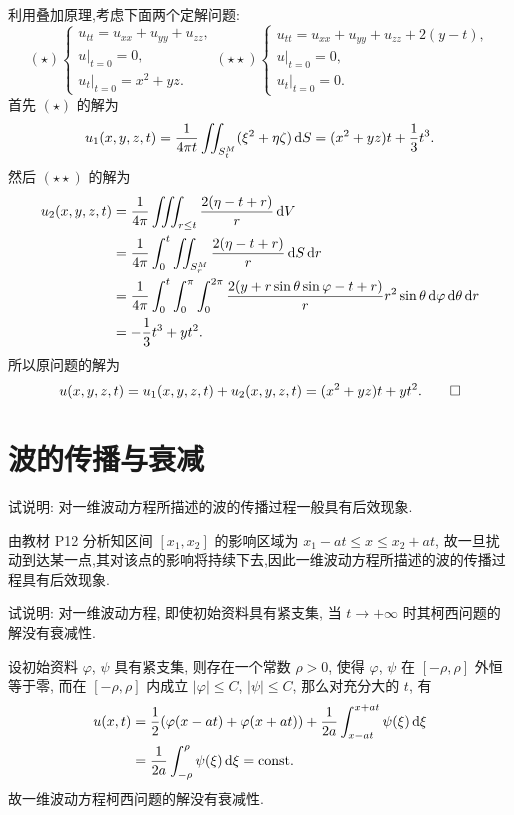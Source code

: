 \begin{solve}
  利用叠加原理,考虑下面两个定解问题:
  \[(\star)
  \begin{cases}
    u_{tt}=u_{xx}+u_{yy}+u_{zz}, \\
    u|_{t=0}=0, \\
    u_t|_{t=0}=x^2+yz.
  \end{cases}
  (\star\star)
  \begin{cases}
    u_{tt} = u_{xx}+u_{yy}+u_{zz}+2(y-t), \\
    u|_{t=0}=0, \\
    u_t|_{t=0}=0.
  \end{cases}\]
  首先 $(\star)$ 的解为
  \[u_1(x,y,z,t) = \frac{1}{4\pi t}\iint_{S_t^M}(\xi^2+\eta\zeta)\mathop{}\!\mathrm{d} S
    = (x^2+yz)t+\frac{1}{3}t^3.\]
  然后 $(\star\star)$ 的解为
  \[\begin{split}
    u_2(x,y,z,t)
    & = \frac{1}{4\pi}\iiint_{r\leq t}\frac{2(\eta-t+r)}{r}\mathop{}\!\mathrm{d} V \\
    & = \frac{1}{4\pi}\int_0^t\iint_{S_r^M}\frac{2(\eta-t+r)}{r}\mathop{}\!\mathrm{d} S\mathop{}\!\mathrm{d} r \\
    & = \frac{1}{4\pi}\int_0^t\int_0^{\pi}\int_0^{2\pi}
      \frac{2(y+r\sin\theta\sin\varphi-t+r)}{r}r^2\sin\theta\mathop{}\!\mathrm{d}\varphi\mathop{}\!\mathrm{d}\theta\mathop{}\!\mathrm{d} r \\
    & = -\frac{1}{3}t^3+yt^2.
  \end{split}\]
  所以原问题的解为
  \[u(x,y,z,t) = u_1(x,y,z,t)+u_2(x,y,z,t)=(x^2+yz)t+yt^2.\qedhere\]
\end{solve}


\section{波的传播与衰减}

\begin{exercise}
  试说明: 对一维波动方程所描述的波的传播过程一般具有后效现象.
\end{exercise}

\begin{solve}
  由教材 P12 分析知区间 $[x_1,x_2]$ 的影响区域为 $x_1-at\leq x\leq x_2+at$,
  故一旦扰动到达某一点,其对该点的影响将持续下去,因此一维波动方程所描述的波的传播过程具有后效现象.
\end{solve}


\begin{exercise}
  试说明: 对一维波动方程, 即使初始资料具有紧支集,
  当 $t\to +\infty$ 时其柯西问题的解没有衰减性.
\end{exercise}

\begin{solve}
  设初始资料 $\varphi$, $\psi$ 具有紧支集, 则存在一个常数 $\rho>0$,
  使得 $\varphi$, $\psi$ 在 $[-\rho,\rho]$ 外恒等于零,
  而在 $[-\rho,\rho]$ 内成立 $|\varphi|\leq C$, $|\psi|\leq C$, 那么对充分大的 $t$, 有
  \begin{align*}
    u(x,t)
    & = \frac{1}{2}(\varphi(x-at)
        +\varphi(x+at))+\frac{1}{2a}\int_{x-at}^{x+at}\psi(\xi)\mathop{}\!\mathrm{d}\xi \\
    & = \frac{1}{2a}\int_{-\rho}^{\rho}\psi(\xi)\mathop{}\!\mathrm{d}\xi= \text{const}.
  \end{align*}
  故一维波动方程柯西问题的解没有衰减性.
\end{solve}


